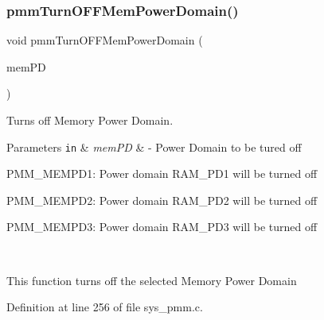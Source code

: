 \subsubsection{\texorpdfstring{pmm\+Turn\+O\+F\+F\+Mem\+Power\+Domain()}{pmmTurnOFFMemPowerDomain()}}
{\footnotesize\ttfamily void pmm\+Turn\+O\+F\+F\+Mem\+Power\+Domain (\begin{DoxyParamCaption}\item[{pmm\+\_\+\+Mem\+P\+D\+\_\+t}]{mem\+PD }\end{DoxyParamCaption})}



Turns off Memory Power Domain. 


\begin{DoxyParams}[1]{Parameters}
\mbox{\tt in}  & {\em mem\+PD} & -\/ Power Domain to be tured off
\begin{DoxyItemize}
\item P\+M\+M\+\_\+\+M\+E\+M\+P\+D1\+: Power domain R\+A\+M\+\_\+\+P\+D1 will be turned off
\item P\+M\+M\+\_\+\+M\+E\+M\+P\+D2\+: Power domain R\+A\+M\+\_\+\+P\+D2 will be turned off
\item P\+M\+M\+\_\+\+M\+E\+M\+P\+D3\+: Power domain R\+A\+M\+\_\+\+P\+D3 will be turned off
\end{DoxyItemize}\\
\hline
\end{DoxyParams}
This function turns off the selected Memory Power Domain 

Definition at line 256 of file sys\+\_\+pmm.\+c.


